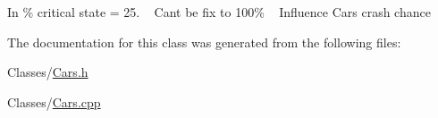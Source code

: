 In \% critical state = 25. ~\newline
 Can\textquotesingle{}t be fix to 100\% ~\newline
 Influence Car\textquotesingle{}s crash chance 

The documentation for this class was generated from the following files\+:\begin{DoxyCompactItemize}
\item 
Classes/\hyperlink{_cars_8h}{Cars.\+h}\item 
Classes/\hyperlink{_cars_8cpp}{Cars.\+cpp}\end{DoxyCompactItemize}
